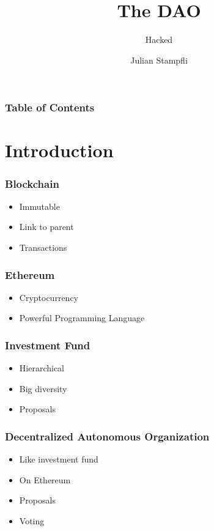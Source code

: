 \documentclass{beamer}
\begin{document}
\title{The DAO}
\subtitle{Hacked}
\author{Julian Stampfli}

\frame{\titlepage}

\begin{frame}
  \frametitle{Table of Contents}
  \tableofcontents
\end{frame}

\section{Introduction}


\begin{frame}[fragile]
  \frametitle{Blockchain}
  \begin{itemize}
    \item Immutable
    \item Link to parent
    \item Transactions
  \end{itemize}
\end{frame}

\begin{frame}[fragile]
  \frametitle{Ethereum}
  \begin{itemize}
    \item Cryptocurrency
    \item Powerful Programming Language
  \end{itemize}
\end{frame}


\begin{frame}[fragile]
  \frametitle{Investment Fund}
  \begin{itemize}
    \item Hierarchical
    \item Big diversity
    \item Proposals
  \end{itemize}
\end{frame}

\begin{frame}[fragile]
  \frametitle{Decentralized Autonomous Organization}
  \begin{itemize}
    \item Like investment fund
    \item On Ethereum
    \item Proposals
    \item Voting
  \end{itemize}
\end{frame}
\end{document}
